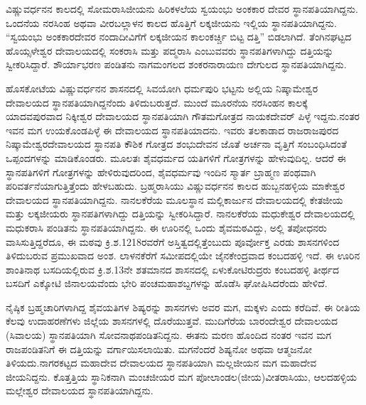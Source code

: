 ವಿಷ್ಣುವರ್ಧನನ ಕಾಲದಲ್ಲಿ ಸೋಮರಾಸಿಜೀಯನು ಹಿರಿಕಳಲೆಯ ಸ್ವಯಂಭು ಅಂಕಕಾರ ದೇವರ ಸ್ಥಾನಪತಿಯಾಗಿದ್ದನು. ಒಂದನೆಯ ನರಸಿಂಹ ಅಥವಾ ವೀರಬಲ್ಲಾಳನ ಕಾಲದ ಹೊತ್ತಿಗೆ ಲಕ್ಕಜೀಯನು ಇಲ್ಲಿಯ ಸ್ಥಾನಪತಿಯಾಗಿದ್ದನು. “ಸ್ವಯಂಭು ಅಂಕಕಾರದೇವರ ನಂದಾದೀವಿಗೆಗೆ ಲಕ್ಕಜೀಯನ ಕಾಲಂಕರ್ಚ್ಚಿ ಬಿಟ್ಟ ದತ್ತಿ” ಬಿಡಲಾಗಿದೆ. ತೆಂಗಿನಘಟ್ಟದ ಹೊಯ್ಸಳೇಶ್ವರ ದೇವಾಲಯದಲ್ಲಿ ಸಂಕರಾಸಿ ಮತ್ತು ಪದ್ಮರಾಸಿ ಎಂಬುವವರು ಸ್ಥಾನಪತಿಗಳಾಗಿದ್ದು ದತ್ತಿಯನ್ನು ಸ್ವೀಕರಿಸಿದ್ದಾರೆ. ಶೌರ್ಯಾಭರಣ ಪಂಡಿತನು ನಾಗಮಂಗಲದ ಶಂಕರನಾರಾಯಣ ದೇಗುಲದ ಸ್ಥಾನಪತಿಯಾಗಿದ್ದನು.

ಹೊಸಕೋಟೆಯ ವಿಷ್ಣುವರ್ಧನನ ಶಾಸನದಲ್ಲಿ ಸಿವಯೋಗಿ ಧರ್ಮಪುರಿ ಭಟ್ಟನು ಅಲ್ಲಿಯ ನಿಷ್ಕಾಮೇಶ್ವರ ದೇವಾಲಯದ ಸ್ಥಾನಪತಿಯಾಗಿದ್ದನೆಂದು ತಿಳಿದುಬರುತ್ತದೆ. ಮುಂದೆ ಮೂರನೆಯ ನರಸಿಂಹನ ಕಾಲಕ್ಕೆ ಯಾದವಪುರವಾದ ನಿಕ್ಕೀಶ್ವರ ದೇವಾಲಯದ ಸ್ಥಾನಪತಿಯಾಗಿ ಗೌತಮಗೋತ್ರದ ನಾಯಕದೇವರ್​ ಪಿಳ್ಳೆ ಇದ್ದನು.ನಂತರ ಇವನ ಮಗ ಉಯಕೊಂಡಪಿಳ್ಳೆ ಈ ದೇವಾಲಯದ ಸ್ಥಾನಪತಿಯಾದನು. ಇವರು ತಲಕಾಡಾದ ರಾಜರಾಜಪುರದ ನಿಷ್ಕಾಮೇಶ್ವರದೇವಾಲಯದ ಸ್ಥಾನಪತಿ ಕೌಶಿಕ ಗೋತ್ರದ ಶಂಭುದೇವನ ಜೊತೆ ಅರ್ಚನಾ ವೃತ್ತಿಗೆ ಸಂಬಂಧಿಸಿದಂತೆ ಒಪ್ಪಂದಗಳನ್ನು ಮಾಡಿಕೊಂಡರು. ಮೂಲತಃ ಶೈವಧರ್ಮದ ಯತಿಗಳಿಗೆ ಗೋತ್ರಗಳನ್ನು ಹೇಳುವುದಿಲ್ಲ. ಆದರೆ ಈ ಸ್ಥಾನಪತಿಗಳಿಗೆ ಗೋತ್ರಗಳನ್ನು ಹೇಳಿರುವುದರಿಂದ, ಶೈವಧರ್ಮವು ಇಂದಿನ ಸ್ಮಾರ್ತ ಬ್ರಾಹ್ಮಣ ಪಂಥವಾಗಿ ಪರಿವರ್ತನೆಯಾಗುತ್ತಿತ್ತೆಂದು ಹೇಳಬಹುದು. ಬ್ರಹ್ಮರಾಸಿಯು ವಿಷ್ಣುವರ್ಧನನ ಕಾಲದ ಹುಬ್ಬನಹಳ್ಳಿಯ ಮಾಕೇಶ್ವರ ದೇವಾಲಯದ ಸ್ಥಾನಪತಿಯಾಗಿದ್ದನು. ನಾನಲಕೆರೆಯ ಮೂಲಸ್ಥಾನ ಮಲ್ಲಿಕಾರ್ಜುನ ದೇವಾಲಯದಲ್ಲಿ ಕೇತಜೀಯ ಮತ್ತು ಲಕ್ಕಜೀಯರು ಸ್ಥಾನಪತಿಗಳಾಗಿದ್ದು ದತ್ತಿಯನ್ನು ಸ್ವೀಕರಿಸಿದ್ದಾರೆ. ನಾನಲಕೆರೆಯ ಮಧುಕೇಶ್ವರ ದೇವಾಲಯದಲ್ಲಿ ಮಧುಕರಾಸಿ ಪಂಡಿತನು ಸ್ಥಾನಪತಿಯಾಗಿದ್ದನು. ಈ ಊರಿನಲ್ಲಿ ಒಂದು ಶೈವಮಠವಿದ್ದು, ಅಲ್ಲಿ ತಪೋಧನರು ವಾಸಿಸುತ್ತಿದ್ದರೆದೂ, ಈ ಮಠವು ಕ್ರಿ.ಶ.1218ರವರೆಗೆ ಅಸ್ತಿತ್ವದಲ್ಲಿತ್ತೆಂಬುದು ಪೂರ್ವೋಕ್ತ ಎರಡು ಶಾಸನಗಳಿಂದ ತಿಳಿದುಬರುವ ಪ್ರಮುಖವಾದ ಅಂಶ. ಲಾಳನಕೆರೆಗೆ ಸಮೀಪದಲ್ಲಿಯೇ ಜೈನಕೇಂದ್ರವಾದ ಕಂಬದಹಳ್ಳಿ ಇದೆ. ಈ ಊರಿನ ಶಾಂತಿನಾಥ ಬಸದಿಯಲ್ಲಿರುವ ಕ್ರಿ.ಶ.13ನೇ ಶತಮಾನದ ಶಾಸನದಲ್ಲಿ ಏಳುಕೋಟಿರುದ್ರರು ಕಂಬದಹಳ್ಳಿ ತೀರ್ಥದ ಬಸದಿಗೆ ಎಕ್ಕೋಟಿ ಜಿನಾಲಯವೆಂದು ಭೇರಿ ಪಂಚಮಹಾಶಬ್ದಗಳನ್ನು ಹೊಡೆಸಿ ಘೋಷಿಸಿದರೆಂದು ಹೇಳಿದೆ.

ನೈಷ್ಠಿಕ ಬ್ರಹ್ಮಚಾರಿಗಳಾಗಿದ್ದ ಶೈವಯತಿಗಳ ಶಿಷ್ಯರನ್ನು ಶಾಸನಗಳು ಅವರ ಮಗ, ಮಕ್ಕಳು ಎಂದು ಕರೆದಿವೆ. ಈ ರೀತಿಯ ಕೆಲವು ಉದಾಹರಣೆಗಳು ಜಿಲ್ಲೆಯ ಶಾಸನಗಳಲ್ಲಿ ದೊರೆಯುತ್ತವೆ. ಮುದಿಗೆರೆಯ ಬಾರಂದೇಶ್ವರ ದೇವಾಲಯದ (ಸಿವಾಲಯ) ಸ್ಥಾನಪತಿಯಾಗಿ ಸೋವನಾಥಪಂಡಿತನಿದ್ದನು. ಈತನು ಮರಣ ಹೊಂದಿದ ನಂತರ ಇವನ ಮಗ ರಾಜಪಂಡಿತನಿಗೆ ಈ ದತ್ತಿಯನ್ನು ವರ್ಗಾಯಿಸಲಾಯಿತು. ಮಗನೆಂದರೆ ಶಿಷ್ಯನೋ ಅಥವಾ ಆತ್ಮಜನೋ ತಿಳಿಯದು.ನಾಗರಕಟ್ಟದ ಮಹಾದೇವ ದೇವಾಲಯದ ಸ್ಥಾನಪತಿಯಾಗಿ ಮಲ್ಲಜೀಯನ ಮಗ ಮಹಾದೇವ ಜೀಯನಿದ್ದನು. ಕೊತ್ತತ್ತಿಯ ಸ್ಥಾನಿಕನಾಗಿ ಮಂಚಜೀಯರ ಮಗ ಪೋಲಾಂಡಲ(ಜೀಯ)ವೀತರಾಸಿಯು, ಆಲದಹಳ್ಳಿಯ ಮಲ್ಲೇಶ್ವರ ದೇವಾಲಯದ ಸ್ಥಾನಪತಿಯಾಗಿದ್ದನು.

